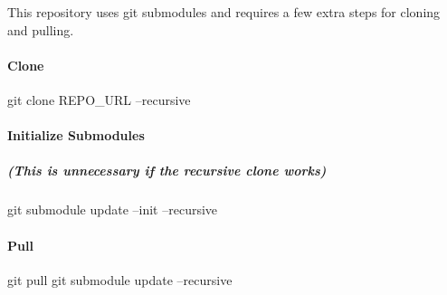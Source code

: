 This repository uses git submodules and requires a few extra steps for cloning and pulling. \paragraph*{Clone}

git clone R\+E\+P\+O\+\_\+\+U\+R\+L --recursive

\paragraph*{Initialize Submodules}

\subparagraph*{(This is unnecessary if the recursive clone works)}

git submodule update --init --recursive

\paragraph*{Pull}

git pull git submodule update --recursive 